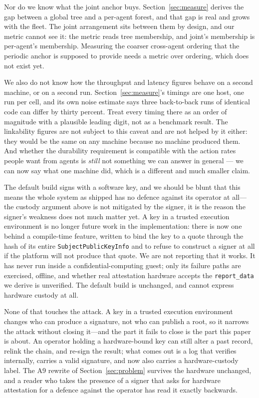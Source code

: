 \documentclass[11pt]{article}
\begin{document}
Nor do we know what the joint anchor buys. Section~\ref{sec:measure} derives
the gap between a global tree and a per-agent forest, and that gap is real and
grows with the fleet. The joint arrangement sits between them by design, and
our metric cannot see it: the metric reads tree membership, and joint's
membership is per-agent's membership. Measuring the coarser cross-agent
ordering that the periodic anchor is supposed to provide needs a metric over
ordering, which does not exist yet.

We also do not know how the throughput and latency figures behave on a second
machine, or on a second run. Section~\ref{sec:measure}'s timings are one host,
one run per cell, and its own noise estimate says three back-to-back runs of
identical code can differ by thirty percent. Treat every timing there as an
order of magnitude with a plausible leading digit, not as a benchmark result.
The linkability figures are not subject to this caveat and are not helped by
it either: they would be the same on any machine because no machine produced
them. And whether the durability
requirement is compatible with the action rates people want from agents is
\emph{still} not something we can answer in general --- we can now say what one
machine did, which is a different and much smaller claim.

The default build signs with a software key, and we should be blunt that this
means the whole system as shipped has no defence against its operator at
all---the custody argument above is not mitigated by the signer, it is the
reason the signer's weakness does not much matter yet. A key in a trusted
execution environment is no longer future work in the implementation: there is
now one behind a compile-time feature, written to bind the key to a quote
through the hash of its entire \texttt{SubjectPublicKeyInfo} and to refuse to
construct a signer at all if the platform will not produce that quote. We are not reporting
that it works. It has never run inside a confidential-computing guest; only its
failure paths are exercised, offline, and whether real attestation hardware
accepts the \texttt{report\_data} we derive is unverified. The default build is
unchanged, and cannot express hardware custody at all.

None of that touches the attack. A key in a trusted execution environment
changes who can produce a signature, not who can publish a root, so it narrows
the attack without closing it---and the part it fails to close is the part this
paper is about. An operator holding a hardware-bound key can still alter a past
record, relink the chain, and re-sign the result; what comes out is a log that
verifies internally, carries a valid signature, and now also carries a
hardware-custody label. The A9 rewrite of Section~\ref{sec:problem} survives
the hardware unchanged, and a reader who takes the presence of a signer that
asks for hardware attestation for a defence against the operator has read it
exactly backwards.
\end{document}
